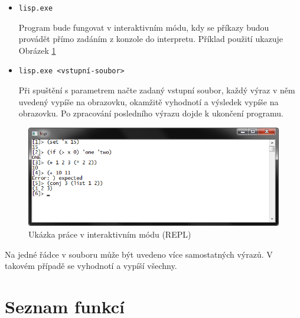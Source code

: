 \documentclass[12pt, a4paper]{report}
\begin{document}
\begin{itemize}
	\item \verb|lisp.exe|
	
	Program bude fungovat v interaktivním módu, kdy se příkazy budou provádět přímo zadáním z konzole do interpretu. Příklad použití ukazuje Obrázek \ref{fig:repl}
	
	\item \verb|lisp.exe <vstupní-soubor>|
	
	Při spuštění s parametrem načte zadaný vstupní soubor, každý výraz v něm uvedený vypíše na obrazovku, okamžitě vyhodnotí a výsledek vypíše na obrazovku. Po zpracování posledního výrazu dojde k ukončení programu.
\end{itemize}

\begin{figure}[h]
	\centering
	\includegraphics[width=0.9\linewidth]{img-repl}
	\caption{Ukázka práce v interaktivním módu (REPL)}
	\label{fig:repl}
\end{figure}

Na jedné řádce v souboru může být uvedeno více samostatných výrazů. V takovém případě se vyhodnotí a vypíší všechny.

\pagebreak
\section{Seznam funkcí}
\end{document}
